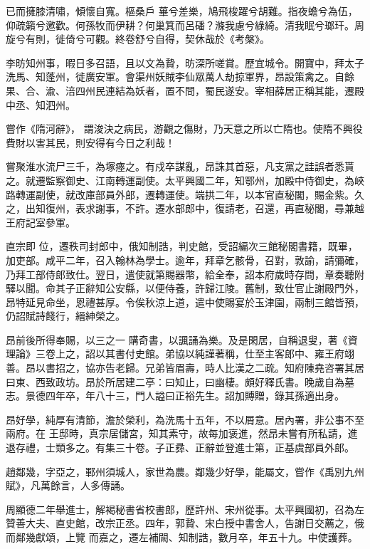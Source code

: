 \begin{pinyinscope}
 已而擁膝清嘯，傾懷自寬。樞桑戶
 蓽兮差樂，鳩飛梭躍兮胡難。指夜蟾兮為伍，仰疏籟兮邀歡。何孫牧而伊耕？何巢箕而呂磻？滌我慮兮綠綺。清我眠兮瑯玕。周旋兮有則，徙倚兮可觀。終卷舒兮自得，契休哉於《考槃》。



 李昉知州事，暇日多召語，且以文為贄，昉深所嗟賞。歷宜城令。開寶中，拜太子洗馬、知蓬州，徙廣安軍。會渠州妖賊李仙眾萬人劫掠軍界，昂設策禽之。自餘果、合、渝、涪四州民連結為妖者，置不問，蜀民遂安。宰相薛居正稱其能，遷殿中丞、知泗州。



 嘗作《隋河辭》，
 謂浚決之病民，游觀之傷財，乃天意之所以亡隋也。使隋不興役費財以害其民，則安得有今日之利哉！



 嘗聚淮水流尸三千，為塚瘞之。有戍卒謀亂，昂誅其首惡，凡支黨之詿誤者悉貰之。就遷監察御史、江南轉運副使。太平興國二年，知鄂州，加殿中侍御史，為峽路轉運副使，就改庫部員外郎，遷轉運使。端拱二年，以本官直秘閣，賜金紫。久之，出知復州，表求謝事，不許。遷水部郎中，復請老，召還，再直秘閣，尋兼越王府記室參軍。



 直宗即
 位，遷秩司封郎中，俄知制誥，判史館，受詔編次三館秘閣書籍，既畢，加吏部。咸平二年，召入翰林為學士。逾年，拜章乞骸骨，召對，敦諭，請彌確，乃拜工部侍郎致仕。翌日，遣使就第賜器幣，給全奉，詔本府歲時存問，章奏聽附驛以聞。命其子正辭知公安縣，以便侍養，許歸江陵。舊制，致仕官止謝殿門外，昂特延見命坐，恩禮甚厚。令俟秋涼上道，遣中使賜宴於玉津園，兩制三館皆預，仍詔賦詩餞行，縉紳榮之。



 昂前後所得奉賜，以三之一
 購奇書，以諷誦為樂。及是閑居，自稱退叟，著《資理論》三卷上之，詔以其書付史館。弟協以純謹著稱，仕至主客郎中、雍王府翊善。昂以書招之，協亦告老歸。兄弟皆眉壽，時人比漢之二疏。知府陳堯咨署其居曰東、西致政坊。昂於所居建二亭：曰知止，曰幽棲。頗好釋氏書。晚歲自為墓志。景德四年卒，年八十三，門人謚曰正裕先生。詔加賻贈，錄其孫適出身。



 昂好學，純厚有清節，澹於榮利，為洗馬十五年，不以屑意。居內署，非公事不至兩府。在
 王邸時，真宗居儲宮，知其素守，故每加褒進，然昂未嘗有所私請，進退存禮，士類多之。有集三十卷。子正彞、正辭並登進士第，正基虞部員外郎。



 趙鄰幾，字亞之，鄆州須城人，家世為農。鄰幾少好學，能屬文，嘗作《禹別九州賦》，凡萬餘言，人多傳誦。



 周顯德二年舉進士，解褐秘書省校書郎，歷許州、宋州從事。太平興國初，召為左贊善大夫、直史館，改宗正丞。四年，郭贄、宋白授中書舍人，告謝日交薦之，俄而鄰幾獻頌，上覽
 而嘉之，遷左補闕、知制誥，數月卒，年五十九。中使護葬。




\end{pinyinscope}
